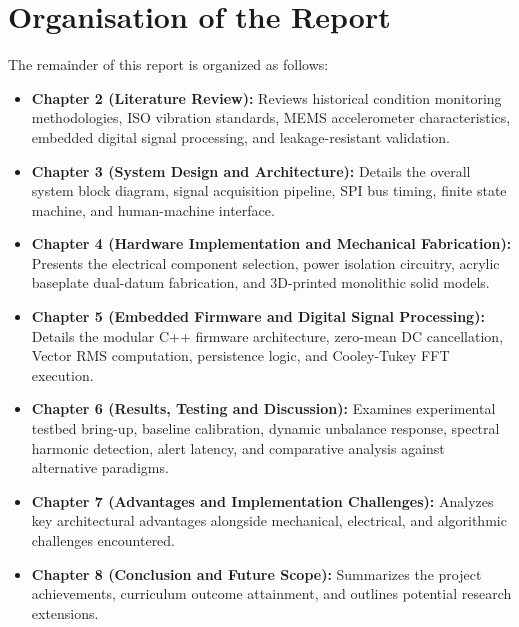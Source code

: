 \section{Organisation of the Report}
The remainder of this report is organized as follows:
\begin{itemize}
    \item \textbf{Chapter 2 (Literature Review):} Reviews historical condition monitoring methodologies, ISO vibration standards, MEMS accelerometer characteristics, embedded digital signal processing, and leakage-resistant validation.
    \item \textbf{Chapter 3 (System Design and Architecture):} Details the overall system block diagram, signal acquisition pipeline, SPI bus timing, finite state machine, and human-machine interface.
    \item \textbf{Chapter 4 (Hardware Implementation and Mechanical Fabrication):} Presents the electrical component selection, power isolation circuitry, acrylic baseplate dual-datum fabrication, and 3D-printed monolithic solid models.
    \item \textbf{Chapter 5 (Embedded Firmware and Digital Signal Processing):} Details the modular C++ firmware architecture, zero-mean DC cancellation, Vector RMS computation, persistence logic, and Cooley-Tukey FFT execution.
    \item \textbf{Chapter 6 (Results, Testing and Discussion):} Examines experimental testbed bring-up, baseline calibration, dynamic unbalance response, spectral harmonic detection, alert latency, and comparative analysis against alternative paradigms.
    \item \textbf{Chapter 7 (Advantages and Implementation Challenges):} Analyzes key architectural advantages alongside mechanical, electrical, and algorithmic challenges encountered.
    \item \textbf{Chapter 8 (Conclusion and Future Scope):} Summarizes the project achievements, curriculum outcome attainment, and outlines potential research extensions.
\end{itemize}
